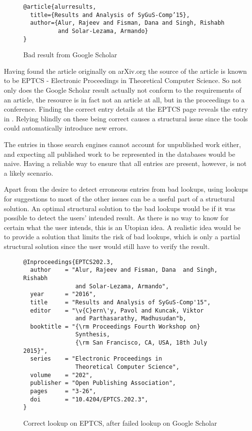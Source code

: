 \begin{figure}
  \centering
\begin{verbatim}
@article{alurresults,
  title={Results and Analysis of SyGuS-Comp’15},
  author={Alur, Rajeev and Fisman, Dana and Singh, Rishabh
          and Solar-Lezama, Armando}
}
\end{verbatim}
  \caption{Bad result from Google Scholar}
\label{fig:scholar_bad_result}
\end{figure}

Having found the article originally on arXiv.org the source of the
article is known to be EPTCS - Electronic Proceedings in Theoretical
Computer Science.  So not only does the Google Scholar result actually
not conform to the requirements of an article, the resource is in fact
not an article at all, but in the proceedings to a conference.
Finding the correct entry details at the EPTCS page reveals the entry
in .  Relying blindly on these being correct
causes a structural issue since the tools could automatically
introduce new errors.

The entries in those search engines cannot account for unpublished
work either, and expecting all published work to be represented in the
databases would be naive.  Having a reliable way to ensure that all
entries are present, however, is not a likely scenario.

Apart from the desire to detect erroneous entries from bad lookups,
using lookups for suggestions to most of the other issues can be a
useful part of a structural solution.  An optimal structural solution
to the bad lookups would be if it was possible to detect the users'
intended result.  As there is no way to know for certain what the user
intends, this is an Utopian idea.  A realistic idea would be to
provide a solution that limits the risk of bad lookups, which is only
a partial structural solution since the user would still have to
verify the result.

\begin{figure}
  \centering
\begin{small}
\begin{verbatim}
@Inproceedings{EPTCS202.3,
  author    = "Alur, Rajeev and Fisman, Dana  and Singh, Rishabh
               and Solar-Lezama, Armando",
  year      = "2016",
  title     = "Results and Analysis of SyGuS-Comp'15",
  editor    = "\v{C}ern\'y, Pavol and Kuncak, Viktor
               and Parthasarathy, Madhusudan"b,
  booktitle = "{\rm Proceedings Fourth Workshop on}
               Synthesis,
               {\rm San Francisco, CA, USA, 18th July 2015}",
  series    = "Electronic Proceedings in
               Theoretical Computer Science",
  volume    = "202",
  publisher = "Open Publishing Association",
  pages     = "3-26",
  doi       = "10.4204/EPTCS.202.3",
}
\end{verbatim}
\end{small}
  \caption{Correct lookup on EPTCS, after failed lookup on Google Scholar}
\label{fig:eptcs_lookup}
\end{figure}


